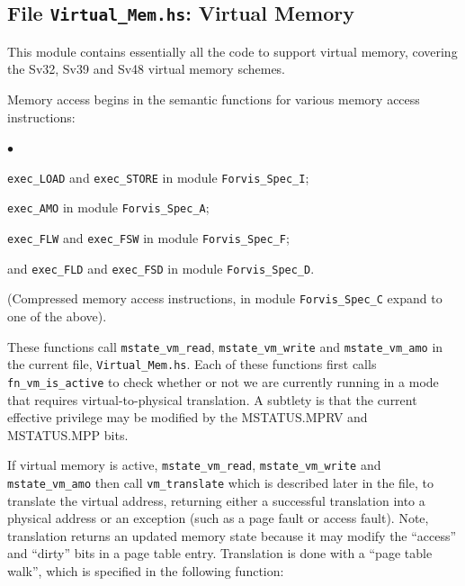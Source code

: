 \documentclass[11pt]{article}
\newenvironment{tightlist}%
{\begin{list}{$\bullet$}{%
    \setlength{\topsep}{0in}
    \setlength{\partopsep}{0in}
    \setlength{\itemsep}{0in}
    \setlength{\parsep}{0in}
    \setlength{\leftmargin}{1.5em}
    \setlength{\rightmargin}{0in}
    \setlength{\itemindent}{0in}
}
}%
{\end{list}
}
\begin{document}

\subsection{File {\tt Virtual\_Mem.hs}: Virtual Memory}

\label{sec_vm}

This module contains essentially all the code to support virtual
memory, covering the Sv32, Sv39 and Sv48 virtual memory schemes.

Memory access begins in the semantic functions for various memory
access instructions:

\begin{tightlist}

\item \verb|exec_LOAD| and \verb|exec_STORE| in module \verb|Forvis_Spec_I|;

\item \verb|exec_AMO| in module \verb|Forvis_Spec_A|;

\item \verb|exec_FLW| and \verb|exec_FSW| in module \verb|Forvis_Spec_F|;

\item and \verb|exec_FLD| and \verb|exec_FSD| in module \verb|Forvis_Spec_D|.

\item (Compressed memory access instructions, in module
\verb|Forvis_Spec_C| expand to one of the above).

\end{tightlist}

These functions call \verb|mstate_vm_read|, \verb|mstate_vm_write| and
\verb|mstate_vm_amo| in the current file, \verb|Virtual_Mem.hs|.  Each
of these functions first calls \verb|fn_vm_is_active| to check whether
or not we are currently running in a mode that requires
virtual-to-physical translation.  A subtlety is that the current
effective privilege may be modified by the MSTATUS.MPRV and
MSTATUS.MPP bits.

If virtual memory is active, \verb|mstate_vm_read|,
\verb|mstate_vm_write| and \verb|mstate_vm_amo| then call
\verb|vm_translate| which is described later in the file, to translate
the virtual address, returning either a successful translation into a
physical address or an exception (such as a page fault or access
fault).  Note, translation returns an updated memory state because it
may modify the ``access'' and ``dirty'' bits in a page table entry.
Translation is done with a ``page table walk'', which is specified in
the following function:
\end{document}

